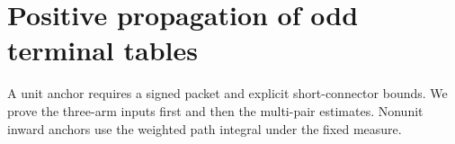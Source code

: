 \section{Positive propagation of odd terminal tables}\label{app:odd-propagation}
A unit anchor requires a signed packet and explicit short-connector bounds. We prove the three-arm inputs first and then the multi-pair estimates. Nonunit inward anchors use the weighted path integral under the fixed measure.







